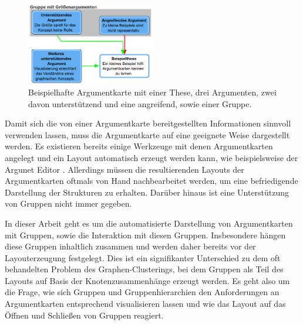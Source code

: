 \begin{figure}[h]
\begin{center}
	\includegraphics[width=0.5\textwidth]{Pics/Beispielargumentkarte.png}
	\caption{Beispielhafte Argumentkarte mit einer These, drei Argumenten, zwei davon unterstützend und eine angreifend, sowie einer Gruppe.}
	\label{f:Beispielargumentkarte}
\end{center}
\end{figure}

Damit sich die von einer Argumentkarte bereitgestellten Informationen sinnvoll verwenden lassen, muss die Argumentkarte %
auf eine geeignete Weise dargestellt werden.
Es existieren bereits einige Werkzeuge mit denen Argumentkarten angelegt  und ein Layout automatisch erzeugt werden kann, wie beispielsweise der Argunet Editor \cite{argunet}. 
Allerdings müssen die resultierenden Layouts der Argumentkarten oftmals von Hand nachbearbeitet werden, um eine befriedigende Darstellung der Strukturen zu erhalten.
Darüber hinaus ist eine Unterstützung von Gruppen nicht immer gegeben. 

In dieser Arbeit geht es um die automatisierte Darstellung von Argumentkarten mit Gruppen, sowie die Interaktion mit diesen Gruppen. Insbesondere hängen diese Gruppen inhaltlich zusammen und werden daher bereits vor der Layouterzeugung festgelegt. Dies ist ein signifikanter Unterschied zu dem oft behandelten Problem des Graphen-Clusterings, bei dem Gruppen als Teil des Layouts auf Basis der Knotenzusammenhänge erzeugt werden.
Es geht also um die Frage, wie sich Gruppen und Gruppenhierarchien den Anforderungen an Argumentkarten entsprechend visualisieren lassen 
und wie das Layout auf das Öffnen und Schließen von Gruppen reagiert.

